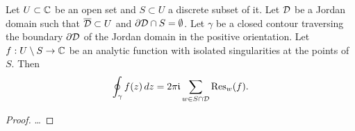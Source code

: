 \begin{corollary}
  \label{thm:jordan_residue_theorem}
  Let $U \subset \mathbb{C}$ be an open set and $S \subset U$ a discrete subset of it.
  Let $\mathcal{D}$ be a Jordan domain such that $\overline{{\mathcal{D}}} \subset U$
  and $\partial \mathcal{D} \cap S = \emptyset$.
  Let $\gamma$ be a closed contour traversing the boundary $\partial \mathcal{D}$
  of the Jordan domain in the positive orientation.
  Let $f : U \setminus S \to \mathbb{C}$ be an analytic function with isolated
  singularities at the points of $S$.
  Then
  \begin{align*}
    \oint_\gamma f(z) \, dz = 2 \pi \mathfrak{i} \sum_{w \in S \cap \mathcal{D}} \mathrm{Res}_{{w}}({f}) .
  \end{align*}
\end{corollary}
\begin{proof}
  \ldots
\end{proof}
